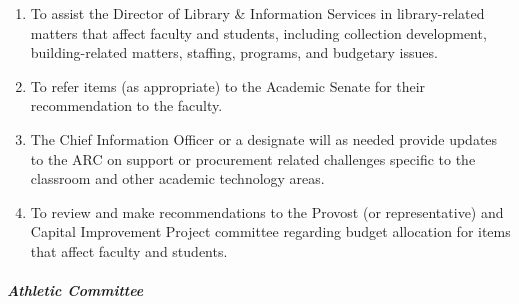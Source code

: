 \begin{enumerate}[label=\alph*)]
{\begin{enumerate}[label=\arabic*)]
								\item{To assist the Director of Library \& Information Services in library-related matters that affect faculty and students, including collection development, building-related matters, staffing, programs, and budgetary issues.}
								\item{To refer items (as appropriate) to the Academic Senate for their recommendation to the faculty.}
								\item{The Chief Information Officer or a designate will as needed provide updates to the ARC on support or procurement related challenges specific to the classroom and other academic technology areas.}

								\item{To review and make recommendations to the Provost (or representative) and Capital Improvement Project committee regarding budget allocation for items that affect faculty and students.}
							\end{enumerate}
						}
					\end{enumerate}
				\subparagraph{Athletic Committee}
